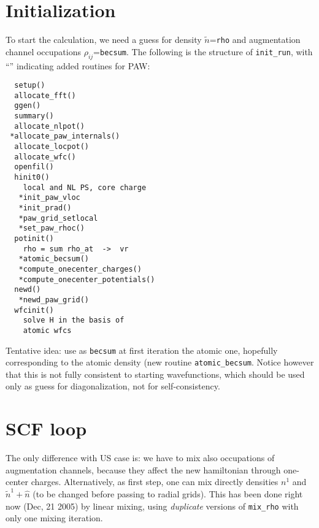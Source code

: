 \documentclass[a4paper,twocolumn,12pt]{article}
\newcommand{\var}[1]{{\tt #1}}
\begin{document}

\section*{Initialization}

To start the calculation, we need a guess for density
$\tilde{n}$=\var{rho} and augmentation channel occupations
$\rho_{ij}$=\var{becsum}.  The following is the structure of
\var{init\_run}, with ``\var{*}'' indicating added routines for PAW:
\begin{verbatim}
  setup()
  allocate_fft()
  ggen()
  summary()
  allocate_nlpot()
 *allocate_paw_internals()
  allocate_locpot()
  allocate_wfc()
  openfil()
  hinit0()
    local and NL PS, core charge
   *init_paw_vloc
   *init_prad()
   *paw_grid_setlocal
   *set_paw_rhoc()
  potinit()
    rho = sum rho_at  ->  vr
   *atomic_becsum()
   *compute_onecenter_charges()
   *compute_onecenter_potentials()
  newd()
   *newd_paw_grid()
  wfcinit()
    solve H in the basis of
    atomic wfcs
\end{verbatim}
Tentative idea: use as \var{becsum} at first iteration the atomic one,
hopefully corresponding to the atomic density (new routine
\var{atomic\_becsum}.  Notice however that this is not fully consistent
to starting wavefunctions, which should be used only as guess for
diagonalization, not for self-consistency.

\section*{SCF loop}

The only difference with US case is: we have to mix also occupations
of augmentation channels, because they affect the new hamiltonian
through one-center charges.  Alternatively, as first step, one can mix
directly densities $n^1$ and $\tilde{n}^1+\hat{n}$ (to be changed
before passing to radial grids).  This has been done right now (Dec,
21 2005) by linear mixing, using {\em duplicate} versions of
\var{mix\_rho} with only one mixing iteration.
\end{document}
